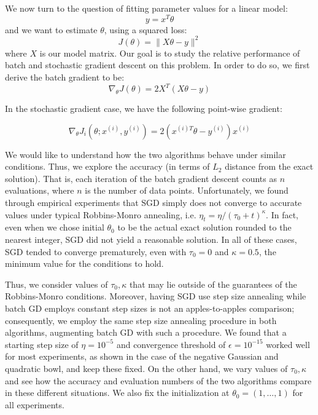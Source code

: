 \documentclass[10pt,psamsfonts]{amsart}
\theoremstyle{definition}
\theoremstyle{remark}
\numberwithin{equation}{section}
\begin{document}
We now turn to the question of fitting parameter values for a linear model:
$$y = x^T\theta$$
and we want to estimate $\theta$, using a squared loss:
$$J(\theta) = \|X\theta - y\|^2$$
where $X$ is our model matrix. Our goal is to study the relative performance of batch and stochastic gradient descent on this problem. In order to do so, we first derive the batch gradient to be:
$$\nabla_{\theta} J(\theta) = 2X^T(X\theta - y)$$

In the stochastic gradient case, we have the following point-wise gradient:

$$\nabla_{\theta} J_i(\theta; x^{(i)}, y^{(i)}) = 2(x^{(i)T}\theta - y^{(i)}) x^{(i)}$$

We would like to understand how the two algorithms behave under similar conditions. Thus, we explore the accuracy (in terms of $L_2$ distance from the exact solution). That is, each iteration of the batch gradient descent counts as $n$ evaluations, where $n$ is the number of data points. Unfortunately, we found through empirical experiments that SGD simply does not converge to accurate values under typical Robbins-Monro annealing, i.e. $\eta_t = \eta/(\tau_0 + t)^{\kappa}$.
In fact, even when we chose initial $\theta_0$ to be the actual exact solution rounded to the nearest integer, SGD did not yield a reasonable solution. In all of these cases, SGD tended to converge prematurely, even with $\tau_0 = 0$ and $\kappa = 0.5$, the minimum value for the conditions to hold.

Thus, we consider values of $\tau_0, \kappa$ that may lie outside of the guarantees of the Robbins-Monro conditions. Moreover, having SGD use step size annealing while batch GD employs constant step sizes is not an apples-to-apples comparison; consequently, we employ the same step size annealing procedure in both algorithms, augmenting batch GD with such a procedure. We found that a starting step size of $\eta = 10^{-5}$ and convergence threshold of $\epsilon = 10^{-15}$ worked well for most experiments, as shown in the case of the negative Gaussian and quadratic bowl, and keep these fixed. On the other hand, we vary values of $\tau_0, \kappa$ and see how the accuracy and evaluation numbers of the two algorithms compare in these different situations. We also fix the initialization at $\theta_0 = (1, \dots, 1)$ for all experiments.
\end{document}
